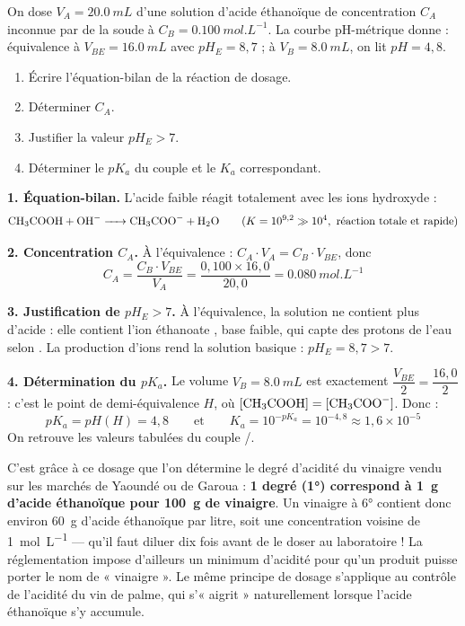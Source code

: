 \documentclass[11pt]{article}
\newcommand{\cle}[1]{{\popxbold\color{popdark}#1}}
\begin{document}
\begin{exoresolu}
On dose $V_A = \SI{20,0}{mL}$ d'une solution d'acide éthanoïque de concentration $C_A$ inconnue par de la soude à $C_B = \SI{0,100}{mol.L^{-1}}$. La courbe pH-métrique donne : équivalence à $V_{BE} = \SI{16,0}{mL}$ avec $pH_E = 8{,}7$ ; à $V_B = \SI{8,0}{mL}$, on lit $pH = 4{,}8$.
\begin{enumerate}
\item Écrire l'équation-bilan de la réaction de dosage.
\item Déterminer $C_A$.
\item Justifier la valeur $pH_E > 7$.
\item Déterminer le $pK_a$ du couple et le $K_a$ correspondant.
\end{enumerate}
\tcblower
\textbf{1. Équation-bilan.} L'acide faible réagit totalement avec les ions hydroxyde :
\[ \ce{CH3COOH + OH- -> CH3COO- + H2O} \qquad (K = 10^{9{,}2} \gg 10^4, \text{ réaction totale et rapide}) \]

\textbf{2. Concentration $C_A$.} À l'équivalence : $C_A \cdot V_A = C_B \cdot V_{BE}$, donc
\[ C_A = \frac{C_B \cdot V_{BE}}{V_A} = \frac{0{,}100 \times 16{,}0}{20{,}0} = \SI{0,080}{mol.L^{-1}} \]

\textbf{3. Justification de $pH_E > 7$.} À l'équivalence, la solution ne contient plus d'acide  : elle contient l'ion éthanoate , base faible, qui capte des protons de l'eau selon . La production d'ions  rend la solution basique : $pH_E = 8{,}7 > 7$.

\textbf{4. Détermination du $pK_a$.} Le volume $V_B = \SI{8,0}{mL}$ est exactement $\dfrac{V_{BE}}{2} = \dfrac{16{,}0}{2}$ : c'est le point de demi-équivalence $H$, où $[\ce{CH3COOH}] = [\ce{CH3COO-}]$. Donc :
\[ pK_a = pH(H) = 4{,}8 \qquad \text{et} \qquad K_a = 10^{-pK_a} = 10^{-4{,}8} \approx 1{,}6 \times 10^{-5} \]
On retrouve les valeurs tabulées du couple /.
\end{exoresolu}

\begin{savaistu}
C'est grâce à ce dosage que l'on détermine le \cle{degré d'acidité} du vinaigre vendu sur les marchés de Yaoundé ou de Garoua : \textbf{1 degré (1°) correspond à \SI{1}{g} d'acide éthanoïque pour \SI{100}{g} de vinaigre}. Un vinaigre à 6° contient donc environ \SI{60}{g} d'acide éthanoïque par litre, soit une concentration voisine de \SI{1}{mol.L^{-1}} — qu'il faut diluer dix fois avant de le doser au laboratoire ! La réglementation impose d'ailleurs un minimum d'acidité pour qu'un produit puisse porter le nom de « vinaigre ». Le même principe de dosage s'applique au contrôle de l'acidité du vin de palme, qui s'« aigrit » naturellement lorsque l'acide éthanoïque s'y accumule.
\end{savaistu}
\end{document}
